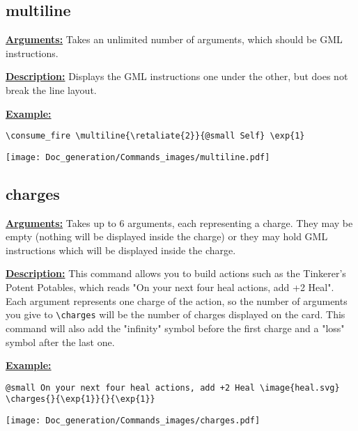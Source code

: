 \documentclass{article}
\begin{document}
\subsection{multiline}
\textbf{\underline{Arguments:}} Takes an unlimited number of arguments, which should be GML instructions.

\textbf{\underline{Description:}} Displays the GML instructions one under the other, but does not break the line layout.

\textbf{\underline{Example:}}

\begin{center}
\begin{BVerbatim}
\consume_fire \multiline{\retaliate{2}}{@small Self} \exp{1}
\end{BVerbatim}
\end{center}

\begin{center}
\texttt{[image: Doc\_generation/Commands\_images/multiline.pdf]}
\end{center}

\subsection{charges}
\textbf{\underline{Arguments:}} Takes up to 6 arguments, each representing a charge. They may be empty (nothing will be displayed inside the charge) or they may hold GML instructions which will be displayed inside the charge.

\textbf{\underline{Description:}} This command allows you to build actions such as the Tinkerer's Potent Potables, which reads "On your next four heal actions, add +2 Heal". Each argument represents one charge of the action, so the number of arguments you give to \verb`\charges` will be the number of charges displayed on the card. This command will also add the "infinity" symbol before the first charge and a "loss" symbol after the last one.

\textbf{\underline{Example:}}

\begin{center}
\begin{BVerbatim}
@small On your next four heal actions, add +2 Heal \image{heal.svg}
\charges{}{\exp{1}}{}{\exp{1}}
\end{BVerbatim}
\end{center}

\begin{center}
\texttt{[image: Doc\_generation/Commands\_images/charges.pdf]}
\end{center}
\end{document}
